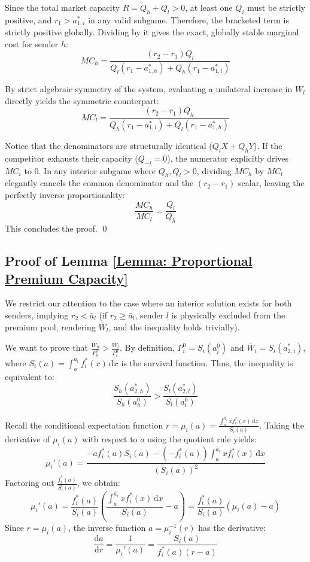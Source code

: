 \documentclass[12pt, a4paper]{article}
\begin{document}
Since the total market capacity $R = Q_h + Q_l > 0$, at least one $Q_i$ must be strictly positive, and $r_1 > a_{1,i}^*$ in any valid subgame. Therefore, the bracketed term is strictly positive globally. Dividing by it gives the exact, globally stable marginal cost for sender $h$:
$$MC_h = \frac{(r_2 - r_1)Q_l}{Q_l(r_1 - a_{1,h}^*) + Q_h(r_1 - a_{1,l}^*)}$$

By strict algebraic symmetry of the system, evaluating a unilateral increase in $W_l$ directly yields the symmetric counterpart:
$$MC_l = \frac{(r_2 - r_1)Q_h}{Q_h(r_1 - a_{1,l}^*) + Q_l(r_1 - a_{1,h}^*)}$$

Notice that the denominators are structurally identical ($Q_l X + Q_h Y$). If the competitor exhausts their capacity ($Q_{-i} = 0$), the numerator explicitly drives $MC_i$ to $0$. In any interior subgame where $Q_h, Q_l > 0$, dividing $MC_h$ by $MC_l$ elegantly cancels the common denominator and the $(r_2 - r_1)$ scalar, leaving the perfectly inverse proportionality:
$$\frac{MC_h}{MC_l} = \frac{Q_l}{Q_h}$$
This concludes the proof. \qed

\subsection*{Proof of Lemma \ref{Lemma: Proportional Premium Capacity}}

We restrict our attention to the case where an interior solution exists for both senders, implying $r_2 < \bar{a}_l$ (if  $r_2 \geq \bar{a}_l$, sender $l$ is physically excluded from the premium pool, rendering $\bar{W}_l$, and the inequality holds trivially). 

We want to prove that $\frac{\bar{W}_h}{P^0_h} > \frac{\bar{W}_l}{P^0_l}$. By definition, $P_i^0 = S_i(a_i^0)$ and $\bar{W}_i = S_i(a_{2,i}^*)$, where $S_i(a) = \int_a^{\bar{a}_i} f_i^*(x) \, \mathrm{d}x$ is the survival function. Thus, the inequality is equivalent to:
\[
    \frac{S_h(a_{2,h}^*)}{S_h(a_h^0)} > \frac{S_l(a_{2,l}^*)}{S_l(a_l^0)}
\]

Recall the conditional expectation function $r = \mu_i(a) = \frac{\int_a^{\bar{a}_i} x f_i^*(x) \, \mathrm{d}x}{S_i(a)}$. Taking the derivative of $\mu_i(a)$ with respect to $a$ using the quotient rule yields:
\[
    \mu_i'(a) = \frac{-a f_i^*(a) S_i(a) - (-f_i^*(a)) \int_a^{\bar{a}_i} x f_i^*(x) \, \mathrm{d}x}{(S_i(a))^2}
\]
Factoring out $\frac{f_i^*(a)}{S_i(a)}$, we obtain:
\[
    \mu_i'(a) = \frac{f_i^*(a)}{S_i(a)} \left( \frac{\int_a^{\bar{a}_i} x f_i^*(x) \, \mathrm{d}x}{S_i(a)} - a \right) = \frac{f_i^*(a)}{S_i(a)} (\mu_i(a) - a)
\]
Since $r = \mu_i(a)$, the inverse function $a = \mu_i^{-1}(r)$ has the derivative:
\[
    \frac{\mathrm{d}a}{\mathrm{d}r} = \frac{1}{\mu_i'(a)} = \frac{S_i(a)}{f_i^*(a) (r - a)}
\]
\end{document}
